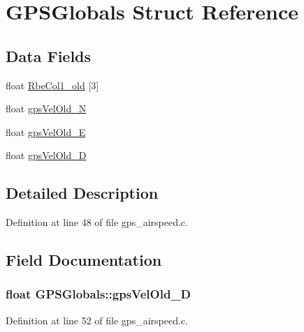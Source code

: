 \hypertarget{struct_g_p_s_globals}{\section{\-G\-P\-S\-Globals \-Struct \-Reference}
\label{struct_g_p_s_globals}
}
\subsection*{\-Data \-Fields}
\begin{DoxyCompactItemize}
\item 
float \hyperlink{struct_g_p_s_globals_a838fd35b2b5e092ed234f1e023a8a171}{\-Rbe\-Col1\-\_\-old} \mbox{[}3\mbox{]}
\item 
float \hyperlink{struct_g_p_s_globals_aed518d0e767d4418cae161cd79bcbb14}{gps\-Vel\-Old\-\_\-\-N}
\item 
float \hyperlink{struct_g_p_s_globals_af55098326f4e20fe87b1afcf1445d1f0}{gps\-Vel\-Old\-\_\-\-E}
\item 
float \hyperlink{struct_g_p_s_globals_a6e70b296af14e6a6535a67619bf2b915}{gps\-Vel\-Old\-\_\-\-D}
\end{DoxyCompactItemize}


\subsection{\-Detailed \-Description}


\-Definition at line 48 of file gps\-\_\-airspeed.\-c.



\subsection{\-Field \-Documentation}
\hypertarget{struct_g_p_s_globals_a6e70b296af14e6a6535a67619bf2b915}{
\subsubsection[{gps\-Vel\-Old\-\_\-\-D}]{\setlength{\rightskip}{0pt plus 5cm}float {\bf \-G\-P\-S\-Globals\-::gps\-Vel\-Old\-\_\-\-D}}}\label{struct_g_p_s_globals_a6e70b296af14e6a6535a67619bf2b915}


\-Definition at line 52 of file gps\-\_\-airspeed.\-c.

